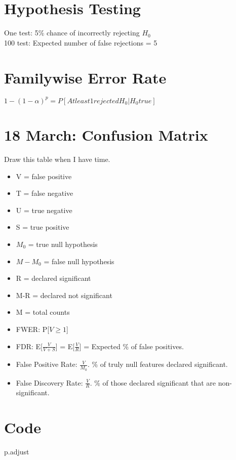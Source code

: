 \documentclass{article}                                                   %
\begin{document}
  \section{Hypothesis Testing}
  One test: 5\% chance of incorrectly rejecting $H_0$\\
  100 test: Expected number of false rejections = 5\\

  \section{Familywise Error Rate}
  $1-(1-\alpha)^p = P[At least 1 rejected H_0 | H_0 true]$

  \section{18 March: Confusion Matrix}
  Draw this table when I have time.
  \begin{itemize}

    \item V = false positive
    \item T = false negative
    \item U = true negative
    \item S = true positive
    \item $M_0$ = true null hypothesis
    \item $M-M_0$ = false null hypothesis
    \item R = declared significant
    \item M-R = declared not significant
    \item M = total counts
    \item FWER: P[$V\ge 1$]
    \item FDR: E[$\frac{V}{V+S}$] = E[$\frac{V}{R}$] = 
               Expected \% of false positives.
    \item False Positive Rate: $\frac{V}{M_0}$. 
          \% of truly null features declared significant.
    \item False Discovery Rate: $\frac{V}{R}$.
          \% of those declared significant that are non-significant.

  \end{itemize}


  \section{Code}
  p.adjust\\
\end{document}
